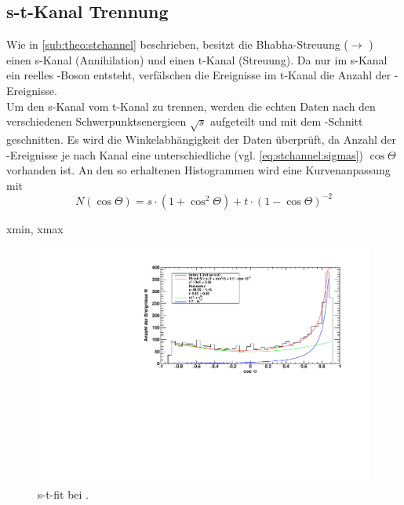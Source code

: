 \subsection{s-t-Kanal Trennung}
Wie in \autoref{sub:theo:stchannel} beschrieben, besitzt die Bhabha-Streuung (\ee $\to$ \ee) einen s-Kanal (Annihilation) 
und einen t-Kanal (Streuung). Da nur im s-Kanal ein reelles \Z -Boson entsteht, verfälschen die Ereignisse im t-Kanal die Anzahl 
der \ee -Ereignisse. \\
Um den s-Kanal vom t-Kanal zu trennen, werden die echten Daten nach den verschiedenen Schwerpunktsenergieen $\sqrt{s}$ aufgeteilt und 
mit dem \ee -Schnitt geschnitten. Es wird die Winkelabhängigkeit der Daten überprüft, da Anzahl der \ee -Ereignisse 
je nach Kanal eine unterschiedliche (vgl. \autoref{eq:stchannel:sigmas}) $\cos \Theta$ vorhanden ist. An den so erhaltenen Histogrammen wird 
eine Kurvenanpassung mit 
\begin{equation}
    N(\cos \Theta) = s \cdot \left( 1 + \cos^2 \Theta \right) + t \cdot \left( 1 - \cos \Theta \right)^{-2}
\end{equation}

xmin, xmax

\begin{figure}[H]
\begin{center}
  \includegraphics[width=\textwidth]{../img/s_t_fit_91-23.pdf}
  \caption{s-t-fit bei .}
  \label{img:label}
\end{center}
\end{figure}

